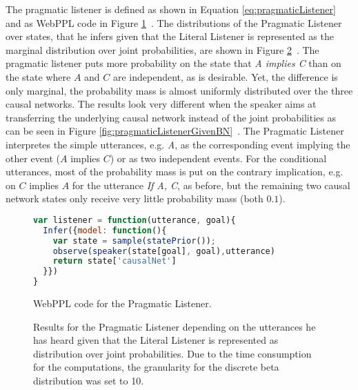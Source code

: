 The pragmatic listener is defined as shown in Equation \ref{eq:pragmaticListener}~ and as WebPPL code in Figure \ref{code:pragmaticListener}~.  The distributions of the Pragmatic Listener over states, that he infers given that the Literal Listener is represented as the marginal distribution over joint probabilities, are shown in Figure \ref{fig:pragmaticListenerGivenJointP}~. The pragmatic listener puts more probability on the state that \textit{A implies C} than on the state where $A$ and $C$ are independent, as is desirable. Yet, the difference is only marginal, the probability mass is almost uniformly distributed over the three causal networks. The results look very different when the speaker aims at transferring the underlying causal network instead of the joint probabilities as can be seen in Figure \ref{fig:pragmaticListenerGivenBN}~. The Pragmatic Listener interpretes the simple utterances, e.g. \textit{A}, as the corresponding event implying the other event ($A$ implies $C$) or as two independent events. For the conditional utterances, most of the probability mass is put on the contrary implication, e.g. on $C$ implies $A$ for the utterance \textit{If A, C}, as before, but the remaining two causal network states only receive very little probability mass (both $0.1$).

\begin{figure}[htp]
\begin{lstlisting}[language=javascript]
var listener = function(utterance, goal){
  Infer({model: function(){
    var state = sample(statePrior());
    observe(speaker(state[goal], goal),utterance)
    return state['causalNet']
  }})
}
\end{lstlisting}
\caption{WebPPL code for the Pragmatic Listener.}
\label{code:pragmaticListener}
\end{figure}

\begin{figure}[htp]
\centering
{}\qquad
{}

\qquad
{}
\caption{Results for the Pragmatic Listener depending on the utterances he has heard given that the Literal Listener is represented as distribution over joint probabilities. Due to the time consumption for the computations, the granularity for the discrete beta distribution was set to 10.}
\label{fig:pragmaticListenerGivenJointP}
\end{figure}

